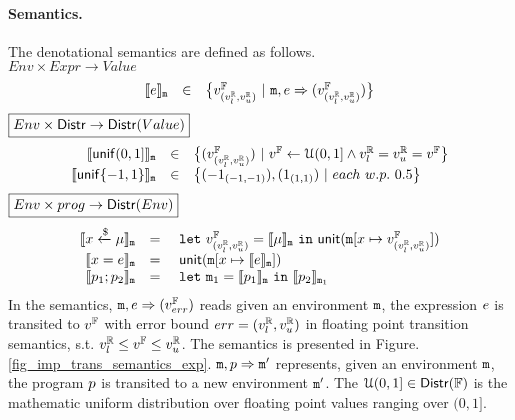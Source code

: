\documentclass[a4paper,11pt]{article}
\begin{document}
\paragraph{Semantics.} The denotational semantics are defined as follows.
\\
$\boxed{Env \times Expr \to Value }$
%
\[
	\begin{array}{rcl}
	\llbracket e \rrbracket_{\mathtt{m}}
	& \in &  
	\big\{v^{\mathbb{F}}_{(v^{\mathbb{R}}_{l}, v^{\mathbb{R}}_{u})} ~|~
	\mathtt{m},  
	e \Rightarrow (v^{\mathbb{F}}_{(v^{\mathbb{R}}_{l}, v^{\mathbb{R}}_{u})})\big\}
	\end{array}
\]
%
$
\boxed{Env \times \mathsf{Distr} \to 
\mathsf{Distr}(Value)}
$
%
\[
	\begin{array}{rcl}
	\llbracket \mathsf{unif}(0, 1] \rrbracket_{\mathtt{m}}
	& \in & 
	\big\{
	(v^{\mathbb{F}}_{(v^{\mathbb{R}}_{l}, v^{\mathbb{R}}_{u})}) ~|~
	v^{\mathbb{F}} \leftarrow \mathcal{U}(0, 1]
	\land v^{\mathbb{R}}_{l} = v^{\mathbb{R}}_{u} = v^{\mathbb{F}}
	\big\}\\
	\llbracket \mathsf{unif}\{-1, 1\} \rrbracket_{\mathtt{m}}
	& \in & 
	\big\{
	(-1_{(-1, -1)}), (1_{(1, 1)}) ~|~
	each ~ w.p. ~ 0.5 
	\big\}\\	
	\end{array}
\]
%
$\boxed{Env \times prog \to \mathsf{Distr}(Env)}$
\[
\begin{array}{rcl}
	\llbracket x \xleftarrow{\$} \mu \rrbracket_{\mathtt{m}}
	& = & 
	~\mathtt{let}~ v^{\mathbb{F}}_{(v^{\mathbb{R}}_{l}, v^{\mathbb{R}}_{u})} = \llbracket \mu \rrbracket_{\mathtt{m}}
	~\mathtt{in}~ 
	\mathsf{unit}(\mathtt{m}[x \mapsto v^{\mathbb{F}}_{(v^{\mathbb{R}}_{l}, v^{\mathbb{R}}_{u})}])
	\\
	\llbracket x = e \rrbracket_{\mathtt{m}}
	& = &  
	~\mathsf{unit}(\mathtt{m}[x \mapsto \llbracket e \rrbracket_{\mathtt{m}}])
	\\
	\llbracket p_1; p_2 \rrbracket_{\mathtt{m}}
	& = &  ~\mathtt{let}~  \mathtt{m}_1 = 
	\llbracket p_1 \rrbracket_{\mathtt{m}} ~\mathtt{in}~
	\llbracket p_2 \rrbracket_{\mathtt{m}_1} 
\end{array}
\]
%
In the semantics, 
%
$\mathtt{m}, e \Rightarrow (v^{\mathbb{F}}_{err})$ reads given an environment
%
$\mathtt{m}$, the expression $e$
%
is transited to $v^{\mathbb{F}}$ with error bound $err = (v^{\mathbb{R}}_{l}, v^{\mathbb{R}}_{u})$
in floating point transition semantics,
%
s.t. $v^{\mathbb{R}}_{l} \leq v^{\mathbb{F}} \leq v^{\mathbb{R}}_{u}$. The semantics is presented in Figure. \ref{fig_imp_trans_semantics_exp}.
%
$\mathtt{m}, p \Rightarrow \mathtt{m}'$ represents, given an environment $\mathtt{m}$,
%
the program $p$ is transited to a new environment $\mathtt{m}'$.
%
The $\mathcal{U}(0, 1] \in \mathsf{Distr}(\mathbb{F})$ is the mathematic uniform distribution over floating point values ranging over $(0, 1]$.
%
%
\end{document}
